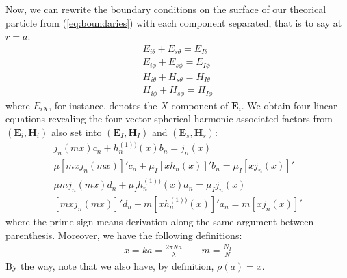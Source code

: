 \documentclass{article}
\numberwithin{equation}{section}
\begin{document}
Now, we can rewrite the boundary conditions on the surface of our theorical particle from (\ref{eq:boundaries}) with each component separated, that is to say at $r=a$:
\begin{equation}\label{eq:boundary_comp}
\begin{aligned}
E_{i\theta} + E_{s\theta} = E_{I\theta}\\
E_{i\phi} + E_{s\phi} = E_{I\phi}\\
H_{i\theta} + H_{s\theta} = H_{I\theta}\\
H_{i\phi} + H_{s\phi} = H_{I\phi}
\end{aligned}
\end{equation}
where $E_{iX}$, for instance, denotes the $X$-component of $\textbf{E}_{i}$. We obtain four linear equations revealing the four vector spherical harmonic associated factors from $(\textbf{E}_{i}, \textbf{H}_{i})$ also set into $(\textbf{E}_{I}, \textbf{H}_{I})$ and $(\textbf{E}_{s}, \textbf{H}_{s})$:
\begin{equation}
\begin{aligned}
j_{n}(mx)c_{n} + h^{(1))}_{n}(x)b_{n} = j_{n}(x) \\
\mu[mxj_{n}(mx)]'c_{n} + \mu_{I}[xh_{n}(x)]'b_{n} = \mu_{I}[xj_{n}(x)]' \\
\mu mj_{n}(mx)d_{n} + \mu_{I}h^{(1))}_{n}(x)a_{n} = \mu_{I}j_{n}(x) \\
[mxj_{n}(mx)]'d_{n}+m[xh^{(1))}_{n}(x)]'a_{n} = m[xj_{n}(x)]'
\end{aligned}
\end{equation}
where the prime sign means derivation along the same argument between parenthesis. Moreover, we have the following definitions:
\begin{equation}\label{eq:def_x_m}
\begin{aligned}
x = ka = \frac{2\pi Na}{\lambda} \qquad m = \frac{N_{I}}{N}
\end{aligned}
\end{equation}
By the way, note that we also have, by definition, $\rho(a)=x$.
\end{document}
